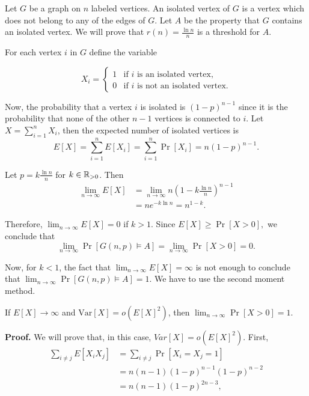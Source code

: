 Let $G$ be a graph on $n$ labeled vertices. An isolated vertex of $G$ is a vertex which does not belong to any of the edges of $G$. Let $A$ be the property that $G$ contains an isolated vertex. We will prove that $\displaystyle{r(n) = \frac{\ln n}{n}}$ is a threshold for $A$. \par

For each vertex $i$ in $G$ define the variable 

\[X_i = 
\left\{
	\begin{array}{ll}
		1  & \mbox{if } i \text{ is an isolated vertex,} \\
		0 & \mbox{if } i \text{ is not an isolated vertex.}
	\end{array}
\right.
\]

Now, the probability that a vertex $i$ is isolated is $(1 - p)^{n - 1}$ since it is the probability that none of the other $n - 1$ vertices is connected to $i$. Let $X = \sum_{i = 1}^n X_i$, then the expected number of isolated vertices is
 \[E[X] = \sum_{i = 1}^{n} E[X_i] = \sum_{i = 1}^{n} \Pr[X_i] = n(1 - p)^{n - 1}.\]

Let $\displaystyle{p = k\frac{\ln n}{n}}$ for $k \in \mathbb{R}_{>0}$. Then
\begin{align*}
    \lim_{n \to \infty} E[X] &= \lim_{n \to \infty} n\left(1 - k\frac{\ln n}{n}\right)^{n - 1} \\
    &= ne^{-k\ln n} = n^{1 - k}.
\end{align*}

Therefore, $\lim_{n \to \infty} E[X] = 0$ if $k > 1$. Since \(E[X] \geq \Pr[X > 0],\) we conclude that \[\lim_{n \to \infty} \Pr[G(n, p) \vDash A] =  \lim_{n \to \infty} \Pr[X > 0] = 0.\] \par
Now, for $k < 1$, the fact that $\lim_{n \to \infty} E[X] = \infty$ is not enough to conclude that \(\lim_{n \to \infty} \Pr[G(n, p) \vDash A] = 1\). We have to use the second moment method. \par

\begin{theorem*}
    If $E[X] \to \infty$ and $\text{Var}[X] = o(E[X]^2)$, then $\lim_{n \to \infty} \Pr[X > 0] = 1$. \cite{alon2016probabilistic}
\end{theorem*}

\textbf{Proof. } We will prove that, in this case, $Var[X] = o(E[X]^2)$. First, 
\begin{align*}
    \sum_{i \neq j}E[X_iX_j] &= \sum_{i \neq j} \Pr[X_i = X_j = 1] \\
    &= n(n - 1)(1 - p)^{n -1}(1 - p)^{n - 2} \\ &= n(n - 1)(1 - p)^{2n - 3},
\end{align*}

